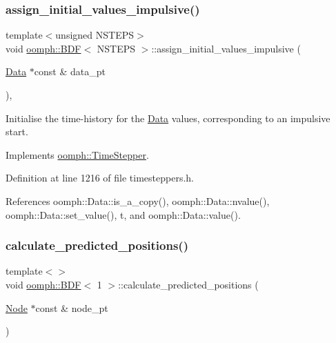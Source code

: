 \subsubsection{\texorpdfstring{assign\+\_\+initial\+\_\+values\+\_\+impulsive()}{assign\_initial\_values\_impulsive()}}
{\footnotesize\ttfamily template$<$unsigned N\+S\+T\+E\+PS$>$ \\
void \hyperlink{classoomph_1_1BDF}{oomph\+::\+B\+DF}$<$ N\+S\+T\+E\+PS $>$\+::assign\+\_\+initial\+\_\+values\+\_\+impulsive (\begin{DoxyParamCaption}\item[{\hyperlink{classoomph_1_1Data}{Data} $\ast$const \&}]{data\+\_\+pt }\end{DoxyParamCaption})\hspace{0.3cm}{\ttfamily [inline]}, {\ttfamily [virtual]}}



Initialise the time-\/history for the \hyperlink{classoomph_1_1Data}{Data} values, corresponding to an impulsive start. 



Implements \hyperlink{classoomph_1_1TimeStepper_a7e894df13c88c96dd8eced2700228225}{oomph\+::\+Time\+Stepper}.



Definition at line 1216 of file timesteppers.\+h.



References oomph\+::\+Data\+::is\+\_\+a\+\_\+copy(), oomph\+::\+Data\+::nvalue(), oomph\+::\+Data\+::set\+\_\+value(), t, and oomph\+::\+Data\+::value().

\mbox{\label{classoomph_1_1BDF_a60f640c138a3e63c35888bedc68c4e5d}} 
\subsubsection{\texorpdfstring{calculate\+\_\+predicted\+\_\+positions()}{calculate\_predicted\_positions()}\hspace{0.1cm}{\footnotesize\ttfamily [1/4]}}
{\footnotesize\ttfamily template$<$$>$ \\
void \hyperlink{classoomph_1_1BDF}{oomph\+::\+B\+DF}$<$ 1 $>$\+::calculate\+\_\+predicted\+\_\+positions (\begin{DoxyParamCaption}\item[{\hyperlink{classoomph_1_1Node}{Node} $\ast$const \&}]{node\+\_\+pt }\end{DoxyParamCaption})\hspace{0.3cm}{\ttfamily [virtual]}}



